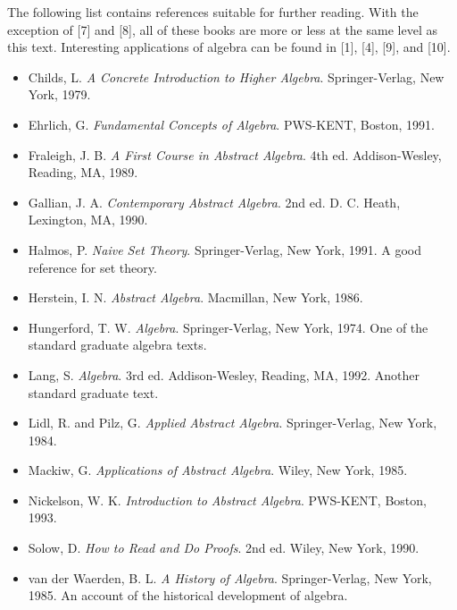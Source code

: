  
{\small
The following list contains references suitable for further reading.  With the exception of [7] and [8], all of these books are more or less  at the same level as this text. Interesting applications of algebra  can be found in [1], [4], [9], and [10].
\begin{itemize}
 
\item[{ \bf [1]}]
Childs, L. 
{\it A Concrete Introduction to Higher Algebra}.
Springer-Verlag, New York, 1979. 
 
\item[{ \bf [2]}]
Ehrlich, G. 
{\it Fundamental Concepts of Algebra}. PWS-KENT, Boston,
1991. 
 
\item[{ \bf [3]}]
Fraleigh, J. B. 
{\it A First Course in Abstract Algebra}. 4th ed.
Addison-Wesley, Reading, MA, 1989. 
 
\item[{ \bf [4]}]
Gallian, J. A. 
{\it Contemporary Abstract Algebra}. 2nd ed. D. C.
Heath, Lexington, MA, 1990.  
 
\item[{ \bf [5]}]
Halmos, P. 
{\it Naive Set Theory}.  Springer-Verlag, New York, 1991.
A good reference for set theory. 
 
\item[{ \bf [6]}]
Herstein, I. N. 
{\it Abstract Algebra}. Macmillan, New York, 1986. 
 
\item[{ \bf [7]}] %
Hungerford, T. W. 
{\it Algebra}. Springer-Verlag, New York, 1974. One
of the standard graduate algebra texts.
 
\item[{ \bf [8]}]
Lang, S. 
{\it Algebra}. 3rd ed. Addison-Wesley, Reading, MA, 1992.
Another standard graduate text.
 
\item[{ \bf [9]}]
Lidl, R. and Pilz, G. 
{\it Applied Abstract Algebra}. Springer-Verlag,
New York, 1984. 
 
\item[{ \bf [10]}]
Mackiw, G. {\it Applications of Abstract Algebra}. Wiley, New York,
1985. 
 
\item[{ \bf [11]}]
Nickelson, W. K. 
{\it Introduction to Abstract Algebra}. PWS-KENT,
Boston, 1993.
 
 
\item[{ \bf [12]}]
Solow, D. 
{\it How to Read and Do Proofs}. 2nd ed. Wiley, New York,
1990. 
 
\item[{ \bf [13]}]
van der Waerden, B. L. 
{\it A History of Algebra}. Springer-Verlag,
New York, 1985. An account of the historical development of algebra. 
 
\end{itemize}
}
 
 
 
 
 
